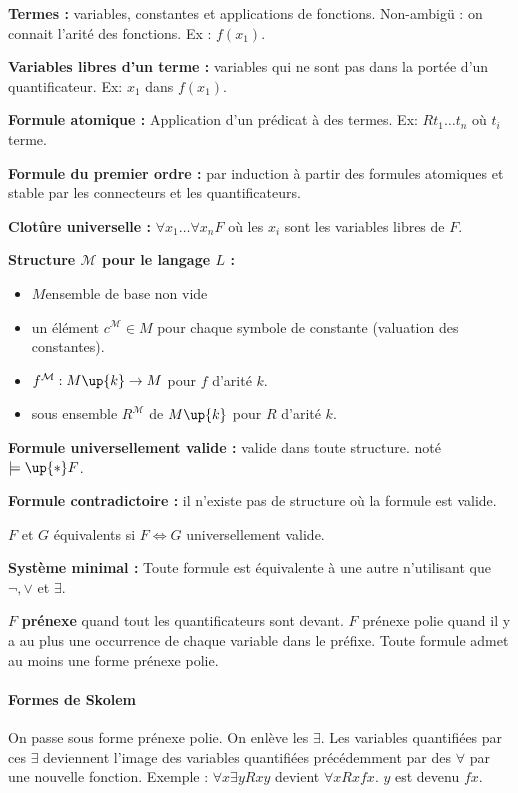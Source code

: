 \documentclass[french]{article}
\begin{document}
\textbf{Termes :} variables, constantes et applications de fonctions. Non-ambigü : on connait l'arité des fonctions. Ex : $f (x_1)$.

\textbf{Variables libres d'un terme :} variables qui ne sont pas dans la portée d'un quantificateur. Ex: $x_1$ dans $f (x_1)$. 

\textbf{Formule atomique :} Application d'un prédicat à des termes. Ex: $R t_1\dots t_n$ où $t_i$ terme.

\textbf{Formule du premier ordre :} par induction à partir des formules atomiques et stable par les connecteurs et les quantificateurs.

\textbf{Clotûre universelle :} $\forall x_1\dots\forall x_n F$ où les $x_i$ sont les variables libres de $F$.

\textbf{Structure $\mathcal{M}$ pour le langage $L$ :}
\begin{itemize}
\item $M$ensemble de base non vide
\item un élément $c^{\mathcal{M}}\in M$ pour chaque symbole de constante (valuation des constantes).
\item $f^{\mathcal{M}}:M\up{k}\rightarrow M$ pour $f$ d'arité $k$.
\item sous ensemble $R^{\mathcal{M}}$ de $M\up{k}$ pour $R$ d'arité $k$.
\end{itemize}


\textbf{Formule universellement valide :} valide dans toute structure. noté $\models\up{*} F$.

\textbf{Formule contradictoire :} il n'existe pas de structure où la formule est valide.

$F$ et $G$ équivalents si $F\Leftrightarrow G$ universellement valide.

\textbf{Système minimal :} Toute formule est équivalente à une autre n'utilisant que $\neg, \vee$ et $\exists$.


$F$ \textbf{prénexe} quand tout les quantificateurs sont devant. $F$ prénexe polie quand il y a au plus une occurrence de chaque variable dans le préfixe. Toute formule admet au moins une forme prénexe polie.

\paragraph{Formes de Skolem}
On passe sous forme prénexe polie. On enlève les $\exists$. Les variables quantifiées par ces $\exists$ deviennent l'image des variables quantifiées précédemment par des $\forall$ par une nouvelle fonction.
Exemple : $\forall x\exists y Rxy$ devient $\forall x Rxfx$. $y$ est devenu $fx$.
\end{document}
